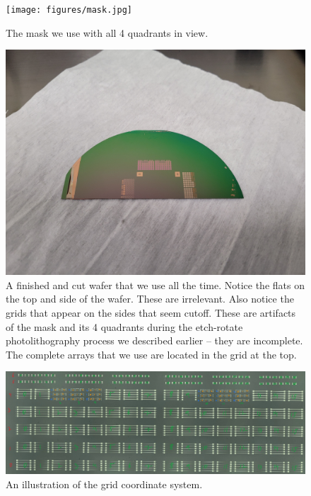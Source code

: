 \documentclass{article}
\begin{document}
          \begin{figure}[H]
            \centering
            \texttt{[image: figures/mask.jpg]}
            \caption{The mask we use with all 4 quadrants in view.}
            \label{mask}
          \end{figure}
          \begin{figure}[H]
            \centering
            \includegraphics[width=\textwidth]{figures/waferdone.jpg}
            \caption{A finished and cut wafer that we use all the time. Notice the flats on the top and side of the
            wafer. These are irrelevant. Also notice the grids that appear on the sides that seem cutoff. These are
            artifacts of the mask and its 4 quadrants during the etch-rotate photolithography process we described
            earlier -- they are incomplete. The complete arrays that we use are located in the grid at the top.}
            \label{waferdone}
          \end{figure}
          \begin{figure}[H]
            \centering
            \includegraphics[width=\textwidth]{figures/maskcoord.jpg}
            \caption{An illustration of the grid coordinate system.}
            \label{gridcoordinate}
          \end{figure}
\end{document}
